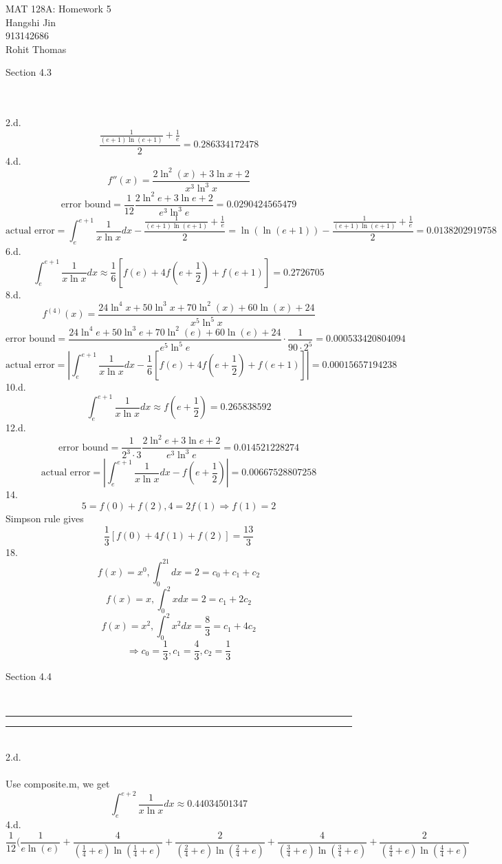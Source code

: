 \documentclass{article}
\begin{document}
\begin{flushright}MAT 128A: Homework 5\\ Hangshi Jin\\ 913142686\\ Rohit Thomas
\end{flushright}
\begin{large}Section 4.3\end{large}
\\\\2.d.\[\frac{\frac{1}{\left(e+1\right)\ln\left(e+1\right)}+\frac{1}{e}}{2}=0.286334172478\]
4.d.\[f''(x)=\frac{2\ln^2\left(x\right)+3\ln x+2}{x^3\ln^3x}\]
\[\text{error bound}=\frac{1}{12}\frac{2\ln^2e+3\ln e+2}{e^3\ln^3e}=0.0290424565479\]
\[\text{actual error}=\int_e^{e+1}\frac{1}{x\ln x}dx-\frac{\frac{1}{\left(e+1\right)\ln\left(e+1\right)}+\frac{1}{e}}{2}=\ln(\ln(e+1))-\frac{\frac{1}{\left(e+1\right)\ln\left(e+1\right)}+\frac{1}{e}}{2}=0.0138202919758\]
6.d.\[\int_e^{e+1}\frac{1}{x\ln x}dx\approx\frac{1}{6}[f(e)+4f(e+\frac{1}{2})+f(e+1)]=0.2726705\]
8.d.\[f^{(4)}(x)=\frac{24\ln^4x+50\ln^3x+70\ln^2\left(x\right)+60\ln\left(x\right)+24}{x^5\ln^5x}\]
\[\text{error bound}=\frac{24\ln^4e+50\ln^3e+70\ln^2\left(e\right)+60\ln\left(e\right)+24}{e^5\ln^5e}\cdot\frac{1}{90\cdot2^5}=0.000533420804094\]	
\[\text{actual error}=\left|\int_e^{e+1}\frac{1}{x\ln x}dx-\frac{1}{6}[f(e)+4f(e+\frac{1}{2})+f(e+1)]\right|=0.00015657194238\]
10.d.\[\int_e^{e+1}\frac{1}{x\ln x}dx\approx f(e+\frac{1}{2})=0.265838592\]
12.d.\[\text{error bound}=\frac{1}{2^3\cdot3}\frac{2\ln^2e+3\ln e+2}{e^3\ln^3e}=0.014521228274\]
\[\text{actual error}=\left|\int_e^{e+1}\frac{1}{x\ln x}dx-f(e+\frac{1}{2})\right|=0.00667528807258\]
14.\[5=f(0)+f(2),4=2f(1)\Rightarrow f(1)=2\]
Simpson rule gives
\[\frac{1}{3}[f(0)+4f(1)+f(2)]=\frac{13}{3}\]
18.\[f(x)=x^0,\int_0^21dx=2=c_0+c_1+c_2\]
\[f(x)=x,\int_0^2xdx=2=c_1+2c_2\]
\[f(x)=x^2,\int_0^2x^2dx=\frac{8}{3}=c_1+4c_2\]
\[\Rightarrow c_0=\frac{1}{3},c_1=\frac{4}{3},c_2=\frac{1}{3}\]
\begin{large}Section 4.4\end{large}
\\\noindent\rule{16cm}{0.4pt}\noindent\rule{16cm}{0.4pt}
\\2.d.
\\\\Use composite.m, we get\[\int_e^{e+2}\frac{1}{x\ln x}dx\approx0.44034501347\]
4.d.\[\frac{1}{12}(\frac{1}{e\ln\left(e\right)}+\frac{4}{\left(\frac{1}{4}+e\right)\ln\left(\frac{1}{4}+e\right)}+\frac{2}{\left(\frac{2}{4}+e\right)\ln\left(\frac{2}{4}+e\right)}+\frac{4}{\left(\frac{3}{4}+e\right)\ln\left(\frac{3}{4}+e\right)}+\frac{2}{\left(\frac{4}{4}+e\right)\ln\left(\frac{4}{4}+e\right)}\]
\end{document}
